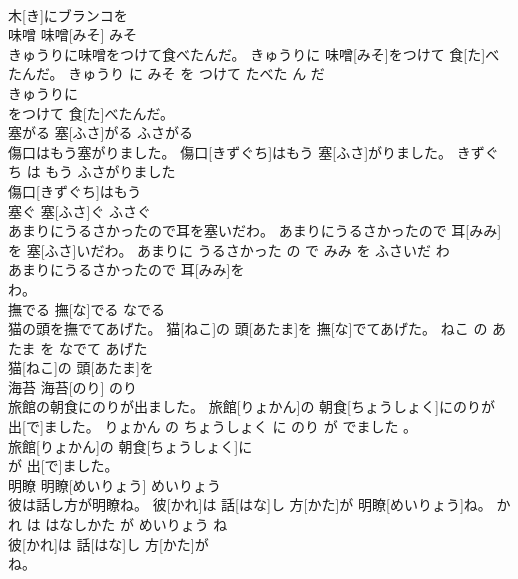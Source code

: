 \documentclass[8pt]{extreport}
\begin{document}
\begin{CJK}{UTF8}{min}
\\	木[き]にブランコを
\\	味噌	味噌[みそ]	みそ	
\\	きゅうりに味噌をつけて食べたんだ。	きゅうりに 味噌[みそ]をつけて 食[た]べたんだ。	きゅうり に みそ を つけて たべた ん だ	
\\	きゅうりに
\\	をつけて 食[た]べたんだ。			
\\	塞がる	塞[ふさ]がる	ふさがる	
\\	傷口はもう塞がりました。	傷口[きずぐち]はもう 塞[ふさ]がりました。	きずぐち は もう ふさがりました	
\\	傷口[きずぐち]はもう
\\	塞ぐ	塞[ふさ]ぐ	ふさぐ	
\\	あまりにうるさかったので耳を塞いだわ。	あまりにうるさかったので 耳[みみ]を 塞[ふさ]いだわ。	あまりに うるさかった の で みみ を ふさいだ わ	
\\	あまりにうるさかったので 耳[みみ]を
\\	わ。			
\\	撫でる	撫[な]でる	なでる	
\\	猫の頭を撫でてあげた。	猫[ねこ]の 頭[あたま]を 撫[な]でてあげた。	ねこ の あたま を なでて あげた	
\\	猫[ねこ]の 頭[あたま]を
\\	海苔	海苔[のり]	のり	
\\	旅館の朝食にのりが出ました。	旅館[りょかん]の 朝食[ちょうしょく]にのりが 出[で]ました。	りょかん の ちょうしょく に のり が でました 。	
\\	旅館[りょかん]の 朝食[ちょうしょく]に
\\	が 出[で]ました。			
\\	明瞭	明瞭[めいりょう]	めいりょう	
\\	彼は話し方が明瞭ね。	彼[かれ]は 話[はな]し 方[かた]が 明瞭[めいりょう]ね。	かれ は はなしかた が めいりょう ね	
\\	彼[かれ]は 話[はな]し 方[かた]が
\\	ね。			
\end{CJK}
\end{document}
